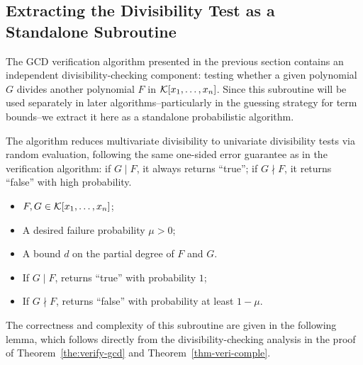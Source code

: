 \documentclass{article}
\numberwithin{equation}{section}
\begin{document}
\subsection*{Extracting the Divisibility Test as a Standalone Subroutine}

The GCD verification algorithm presented in the previous section contains an independent divisibility-checking component: testing whether a given polynomial $G$ divides another polynomial $F$ in ${\mathcal{K}}[x_1,\dots,x_n]$. Since this subroutine will be used separately in later algorithms--particularly in the guessing strategy for term bounds--we extract it here as a standalone probabilistic algorithm.

The algorithm reduces multivariate divisibility to univariate divisibility tests via random evaluation, following the same one-sided error guarantee as in the verification algorithm: if $G \mid F$, it always returns ``true''; if $G \nmid F$, it returns ``false'' with high probability.



\begin{algorithm}
\caption{Probabilistic Divisibility Test over a Field}
\label{alg:divisibility-field}
\begin{algorithmic}[1]
\Require
    \begin{itemize}
        \item $F, G \in {\mathcal{K}}[x_1,\dots,x_n]$;
        \item A desired failure probability $\mu > 0$;
        \item A bound $d$ on the partial degree of $F$ and $G$.
    \end{itemize}
\Ensure
    \begin{itemize}
        \item If $G \mid F$, returns ``true'' with probability $1$;
        \item If $G \nmid F$, returns ``false'' with probability at least $1-\mu$.
    \end{itemize}
\end{algorithmic}
\end{algorithm}

The correctness and complexity of this subroutine are given in the following lemma, which follows directly from the divisibility-checking analysis in the proof of Theorem~\ref{the:verify-gcd} and Theorem~\ref{thm-veri-comple}.
\end{document}
